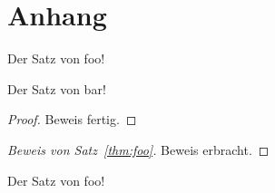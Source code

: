 \newpage
\section{Anhang}

\begin{theorem}
	Der Satz von foo!
\end{theorem}
\begin{theorem}
	Der Satz von bar!
	\label{thm:foo}
\end{theorem}
\begin{proof}
	Beweis fertig.
\end{proof}
\begin{proof}[Beweis von Satz~\ref{thm:foo}]
	Beweis erbracht.
\end{proof}


\begin{Bemerkung}
	Der Satz von foo!
	
\end{Bemerkung}




